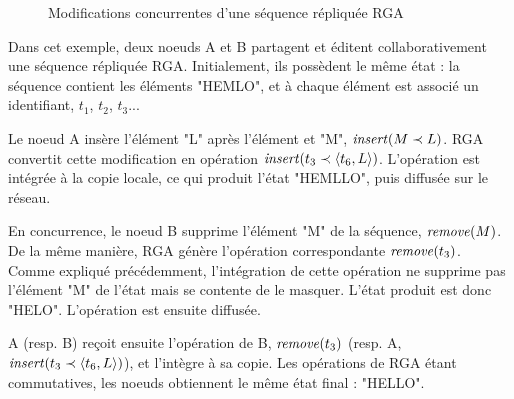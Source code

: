 \begin{figure}[!ht]
{
  }
  \caption{Modifications concurrentes d'une séquence répliquée \ac{RGA}}
  \label{fig:rga}
\end{figure}

Dans cet exemple, deux noeuds A et B partagent et éditent collaborativement une séquence répliquée \ac{RGA}.
Initialement, ils possèdent le même état : la séquence contient les éléments "HEMLO", et à chaque élément est associé un identifiant, \eg $t_1$, $t_2$, $t_3$...

Le noeud A insère l'élément "L" après l'élément et "M", \ie $\mathit{insert}(M \prec L)$.
RGA convertit cette modification en opération $\mathit{insert}(t_3 \prec \langle t_6,L \rangle)$.
L'opération est intégrée à la copie locale, ce qui produit l'état "HEMLLO", puis diffusée sur le réseau.

En concurrence, le noeud B supprime l'élément "M" de la séquence, \ie $\mathit{remove}(M)$.
De la même manière, \ac{RGA} génère l'opération correspondante $\mathit{remove}(t_3)$.
Comme expliqué précédemment, l'intégration de cette opération ne supprime pas l'élément "M" de l'état mais se contente de le masquer.
L'état produit est donc "HELO".
L'opération est ensuite diffusée.

A (resp. B) reçoit ensuite l'opération de B, $\mathit{remove}(t_3)$ (resp. A, $\mathit{insert}(t_3 \prec \langle t_6,L \rangle)$), et l'intègre à sa copie.
Les opérations de \ac{RGA} étant commutatives, les noeuds obtiennent le même état final : "HELLO".

